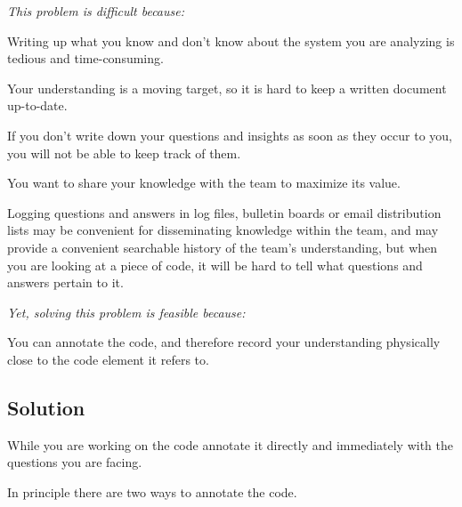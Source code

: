 \documentclass[a4paper,10pt,twoside]{book}
\begin{document}
\emph{This problem is difficult because:}

\begin{bulletlist}
\item Writing up what you know and don't know about the system you are analyzing is tedious and time-consuming.

\item Your understanding is a moving target, so it is hard to keep a written document up-to-date.

\item If you don't write down your questions and insights as soon as they occur to you, you will not be able to keep track of them.

\item You want to share your knowledge with the team to maximize its value.

\item Logging questions and answers in log files, bulletin boards or email distribution lists may be convenient for disseminating knowledge within the team, and may provide a convenient searchable history of the team's understanding, but when you are looking at a piece of code, it will be hard to tell what questions and answers pertain to it.
\end{bulletlist}

\emph{Yet, solving this problem is feasible because:}

\begin{bulletlist}
\item You can annotate the code, and therefore record your understanding physically close to the code element it refers to.
\end{bulletlist}

\subsection*{Solution}

While you are working on the code annotate it directly and immediately with the questions you are facing. 

In principle there are two ways to annotate the code.
\end{document}

